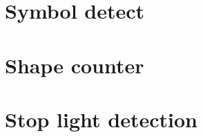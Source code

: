 

	\section{Symbol detect}



	\section{Shape counter}


	
	\section{Stop light detection}
	


	
	



